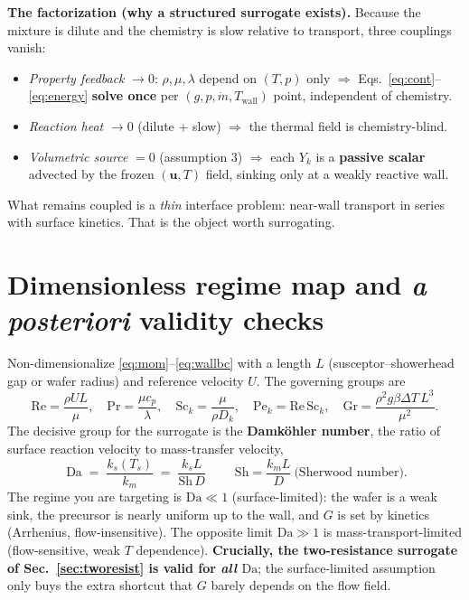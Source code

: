\documentclass[11pt]{article}
\newcommand{\uv}{\mathbf{u}}
\newcommand{\Da}{\mathrm{Da}}
\newcommand{\Sh}{\mathrm{Sh}}
\newcommand{\Rey}{\mathrm{Re}}
\newcommand{\Prn}{\mathrm{Pr}}
\newcommand{\Sc}{\mathrm{Sc}}
\newcommand{\Pe}{\mathrm{Pe}}
\newcommand{\Gr}{\mathrm{Gr}}
\begin{document}
\begin{keybox}
\textbf{The factorization (why a structured surrogate exists).}
Because the mixture is dilute and the chemistry is slow relative to transport, three couplings vanish:
\begin{itemize}[leftmargin=1.3em,itemsep=1pt]
\item \emph{Property feedback} $\to 0$: $\rho,\mu,\lambda$ depend on $(T,p)$ only $\Rightarrow$ Eqs.~\eqref{eq:cont}--\eqref{eq:energy} \textbf{solve once} per $(g,p,\dot m,T_{\text{wall}})$ point, independent of chemistry.
\item \emph{Reaction heat} $\to 0$ (dilute + slow) $\Rightarrow$ the thermal field is chemistry-blind.
\item \emph{Volumetric source} $=0$ (assumption 3) $\Rightarrow$ each $Y_k$ is a \textbf{passive scalar} advected by the frozen $(\uv,T)$ field, sinking only at a weakly reactive wall.
\end{itemize}
What remains coupled is a \emph{thin} interface problem: near-wall transport in series with surface kinetics. That is the object worth surrogating.
\end{keybox}

\section{Dimensionless regime map and \emph{a posteriori} validity checks}
\label{sec:regime}

Non-dimensionalize \eqref{eq:mom}--\eqref{eq:wallbc} with a length $L$ (susceptor--showerhead gap or wafer radius) and reference velocity $U$. The governing groups are
\begin{equation}
\Rey=\frac{\rho U L}{\mu},\quad
\Prn=\frac{\mu c_p}{\lambda},\quad
\Sc_k=\frac{\mu}{\rho D_k},\quad
\Pe_k=\Rey\,\Sc_k,\quad
\Gr=\frac{\rho^2 g \beta \Delta T\,L^3}{\mu^2}.
\end{equation}
The decisive group for the surrogate is the \textbf{Damk\"ohler number}, the ratio of surface reaction velocity to mass-transfer velocity,
\begin{equation}
\boxed{\;\Da \;=\; \frac{k_{s}(T_s)}{k_{m}} \;=\; \frac{k_s L}{\Sh\, D}\;}
\qquad
\Sh=\frac{k_m L}{D}\ \text{(Sherwood number).}
\end{equation}
The regime you are targeting is $\boxed{\Da \ll 1}$ (surface-limited): the wafer is a weak sink, the precursor is nearly uniform up to the wall, and $G$ is set by kinetics (Arrhenius, flow-insensitive). The opposite limit $\Da\gg 1$ is mass-transport-limited (flow-sensitive, weak $T$ dependence). \textbf{Crucially, the two-resistance surrogate of Sec.~\ref{sec:tworesist} is valid for \emph{all} $\Da$}; the surface-limited assumption only buys the extra shortcut that $G$ barely depends on the flow field.
\end{document}
